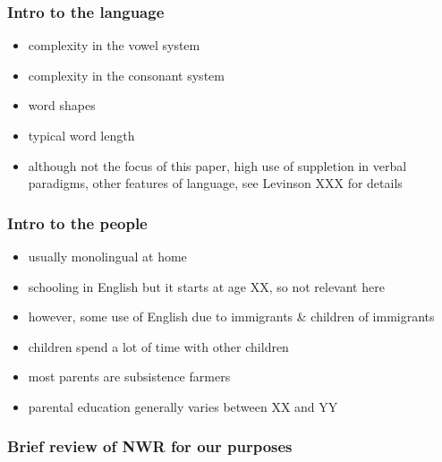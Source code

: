 \documentclass[english,,man,floatsintext]{apa6}
\providecommand{\tightlist}{%
  \setlength{\itemsep}{0pt}\setlength{\parskip}{0pt}}
\begin{document}
\hypertarget{intro-to-the-language}{%
\subsubsection{Intro to the language}\label{intro-to-the-language}}

\begin{itemize}
\tightlist
\item
  complexity in the vowel system
\item
  complexity in the consonant system
\item
  word shapes
\item
  typical word length
\item
  although not the focus of this paper, high use of suppletion in verbal paradigms, other features of language, see Levinson XXX for details
\end{itemize}

\hypertarget{intro-to-the-people}{%
\subsubsection{Intro to the people}\label{intro-to-the-people}}

\begin{itemize}
\tightlist
\item
  usually monolingual at home
\item
  schooling in English but it starts at age XX, so not relevant here
\item
  however, some use of English due to immigrants \& children of immigrants
\item
  children spend a lot of time with other children
\item
  most parents are subsistence farmers
\item
  parental education generally varies between XX and YY
\end{itemize}

\hypertarget{brief-review-of-nwr-for-our-purposes}{%
\subsubsection{Brief review of NWR for our purposes}\label{brief-review-of-nwr-for-our-purposes}}
\end{document}

